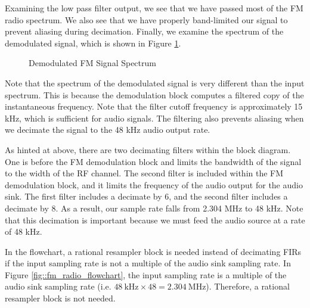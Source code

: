 \documentclass{article}
\begin{document}
\noindent Examining the low pass filter output, we see that we have passed most of the FM radio spectrum. We also see that we have properly band-limited our signal to prevent aliasing during decimation. Finally, we examine the spectrum of the demodulated signal, which is shown in Figure \ref{fig::fm_radio_demod_spectrum}.

\begin{figure}[H]
	\centerline{}
	\caption{Demodulated FM Signal Spectrum}
	\label{fig::fm_radio_demod_spectrum}
\end{figure}

\noindent Note that the spectrum of the demodulated signal is very different than the input spectrum. This is because the demodulation block computes a filtered copy of the instantaneous frequency. Note that the filter cutoff frequency is approximately 15 kHz, which is sufficient for audio signals. The filtering also prevents aliasing when we decimate the signal to the 48 kHz audio output rate.

As hinted at above, there are two decimating filters within the block diagram. One is before the FM demodulation block and limits the bandwidth of the signal to the width of the RF channel. The second filter is included within the FM demodulation block, and it limits the frequency of the audio output for the audio sink. The first filter includes a decimate by 6, and the second filter includes a decimate by 8. As a result, our sample rate falls from 2.304 MHz to 48 kHz. Note that this decimation is important because we must feed the audio source at a rate of 48 kHz.

In the flowchart, a rational resampler block is needed instead of decimating FIRs if the input sampling rate is not a multiple of the audio sink sampling rate. In Figure \ref{fig::fm_radio_flowchart}, the input sampling rate is a multiple of the audio sink sampling rate (i.e. $48\ \text{kHz} \times 48 = 2.304\ \text{MHz}$). Therefore, a rational resampler block is not needed.
\end{document}

